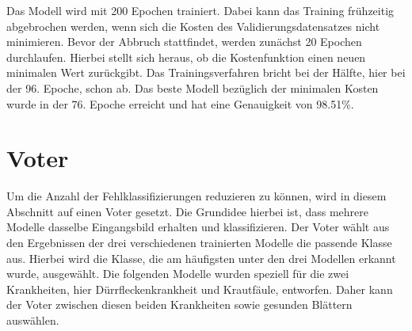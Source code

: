 Das Modell wird mit 200 Epochen trainiert. Dabei kann das Training frühzeitig abgebrochen werden, wenn sich die Kosten des Validierungsdatensatzes nicht minimieren. Bevor der Abbruch stattfindet, werden zunächst 20 Epochen durchlaufen. Hierbei stellt sich heraus, ob die Kostenfunktion einen neuen minimalen Wert zurückgibt. Das Trainingsverfahren bricht bei der Hälfte, hier bei der 96. Epoche, schon ab. Das beste Modell bezüglich der minimalen Kosten wurde in der 76. Epoche erreicht und hat eine Genauigkeit von 98.51\%.







\section{Voter}
\label{sec:voter}
Um die Anzahl der Fehlklassifizierungen reduzieren zu können, wird in diesem Abschnitt auf einen Voter gesetzt. Die Grundidee hierbei ist, dass mehrere Modelle dasselbe Eingangsbild erhalten und klassifizieren. Der Voter wählt aus den Ergebnissen der drei verschiedenen trainierten Modelle die passende Klasse aus. Hierbei wird die Klasse, die am häufigsten unter den drei Modellen erkannt wurde, ausgewählt. Die folgenden Modelle wurden speziell für die zwei Krankheiten, hier Dürrfleckenkrankheit und Krautfäule, entworfen. Daher kann der Voter zwischen diesen beiden Krankheiten sowie gesunden Blättern auswählen.


